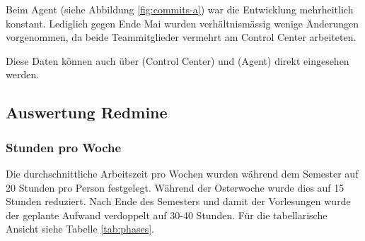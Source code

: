 Beim Agent (siehe Abbildung \ref{fig:commits-a}) war die Entwicklung mehrheitlich konstant. Lediglich gegen Ende Mai wurden verhältnismässig wenige Änderungen vorgenommen, da beide Teammitglieder vermehrt am Control Center arbeiteten.

Diese Daten können auch über  (Control Center) und  (Agent) direkt eingesehen werden.

\subsection*{Auswertung Redmine}

\subsubsection*{Stunden pro Woche}

Die durchschnittliche Arbeitszeit pro Wochen wurden während dem Semester auf 20 Stunden pro Person festgelegt. Während der Osterwoche wurde dies auf 15 Stunden reduziert. Nach Ende des Semesters und damit der Vorlesungen wurde der geplante Aufwand verdoppelt auf 30-40 Stunden. Für die tabellarische Ansicht siehe Tabelle \ref{tab:phases}.

